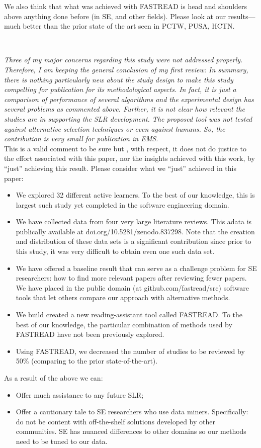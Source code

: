 \documentclass{svjour3}
\theoremstyle{break}
\newcommand{\review}[1]{{\textit{#1}}~\\}
\begin{document}
We also think that what was achieved with FASTREAD is head and shoulders above anything done before (in SE, and other fields). Please look at our results--- much better than the prior state of the art seen in PCTW, PUSA, HCTN.



\par ~

\review{Three of my major concerns regarding this study were not addressed properly. Therefore, I am keeping the general conclusion of my first review: In summary, there is nothing particularly new about the study design to make this study compelling for publication for its methodological aspects. In fact, it is just a comparison of performance of several algorithms and the experimental design has several problems as commented above. Further, it is not clear how relevant the studies are in supporting the SLR development. The proposed tool was not tested against alternative selection techniques or even against humans. So, the contribution is very small for publication in EMS.}


This is a valid comment to be sure  but , with respect, it does not do justice to the effort
associated with this paper, nor the insights achieved with
this work, by ``just'' achieving this result. Please consider what  we ``just'' achieved in this paper:
\begin{itemize}
\item
We explored 32 different active learners. To the best of our knowledge, this is largest
such study yet completed in the software engineering domain. 
\item
We  have collected data from four very large literature reviews. This adata is publically available at
doi.org/10.5281/zenodo.837298. Note that the creation and distribution of these data sets is a significant contribution since prior to this study, it was  very difficult to obtain even one such data set. 
\item
We have offered a baseline result that can serve
as a challenge problem for SE researchers: how to find more relevant
papers after reviewing fewer  papers. 
We  have  placed in the public domain (at github.com/fastread/src) software
tools that let others compare our approach with alternative methods.
\item
We build created a new reading-assistant tool called FASTREAD.
To the best of our knowledge, the particular combination of methods used by FASTREAD have not been previously explored.
\item
Using FASTREAD, we decreased the number of studies to be reviewed by 50\% (comparing to the prior state-of-the-art).
\end{itemize} As a result  of the above we can:
\begin{itemize}
\item Offer much assistance to any future SLR;
\item Offer a cautionary tale to SE 
researchers who use data miners. Specifically: do not be content with off-the-shelf solutions developed
by other communities. SE   has nuanced differences to other domains so our methods need to be tuned to our data.
\end{itemize}
\end{document}
